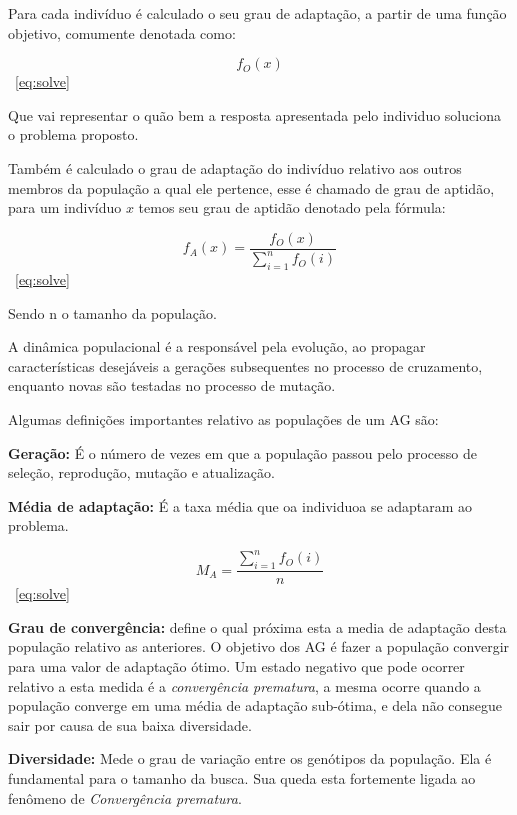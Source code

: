 Para cada indivíduo é calculado o seu grau de adaptação, a partir de uma função objetivo, comumente denotada como:

\begin{equation} \label{eq:solve}
f_O(x)  
\end{equation}
\cite{DiogoCLucas}~\ref{eq:solve}

Que vai representar o quão bem a resposta apresentada pelo individuo soluciona o problema proposto.

Também é calculado o grau de adaptação do indivíduo relativo aos outros membros da população a qual ele pertence, esse é chamado de grau de aptidão, para um indivíduo $x$ temos seu grau de aptidão denotado pela fórmula:


\begin{equation} \label{eq:solve}
	f_A(x) = \frac{f_O(x)}{ \sum_{i=1}^{n}  f_O(i)  }  
\end{equation}
\cite{DiogoCLucas}~\ref{eq:solve}

 Sendo n o tamanho da população.
 
 A dinâmica populacional é a responsável pela evolução, ao propagar características desejáveis a gerações subsequentes no processo de cruzamento, enquanto novas são testadas no processo de mutação.
 
 Algumas definições importantes relativo as populações de um AG são:
 
 \textbf{Geração:} É o número de vezes em que a população passou pelo processo de seleção, reprodução, mutação e atualização.

\textbf{Média de adaptação:} É a taxa média que oa individuoa se adaptaram ao problema.

\begin{equation} \label{eq:solve}
M_A = \frac{ \sum_{i=1}^{n} f_O(i) }{n}
\end{equation}
\cite{DiogoCLucas}~\ref{eq:solve}

\textbf{Grau de convergência:} define o qual próxima esta a media de adaptação desta população relativo as anteriores. O objetivo dos AG é fazer a população convergir para uma valor de adaptação ótimo.
Um estado negativo que pode ocorrer relativo a esta medida é a \textit{convergência prematura}, a mesma ocorre quando a população converge em uma média de adaptação sub-ótima, e dela não consegue sair por causa de sua baixa diversidade.

\textbf{Diversidade:} Mede o grau de variação entre os genótipos da população. Ela é fundamental para o tamanho da busca.
Sua queda esta fortemente ligada ao fenômeno de \textit{Convergência prematura}.

